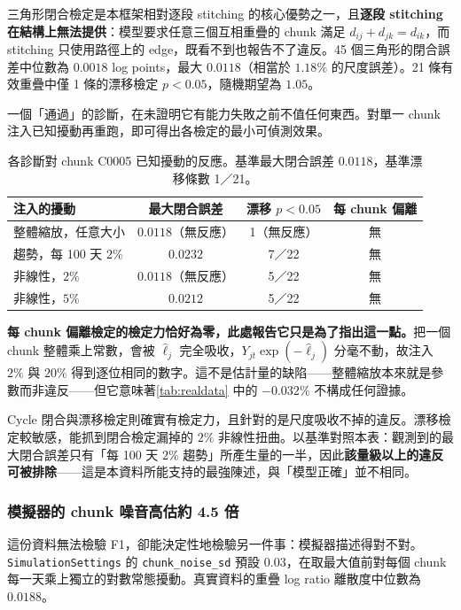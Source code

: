 \documentclass[12pt,a4paper,oneside]{article}
\begin{document}
三角形閉合檢定是本框架相對逐段 stitching 的核心優勢之一，且\textbf{逐段 stitching 在結構上無法提供}：模型要求任意三個互相重疊的 chunk 滿足 $d_{ij}+d_{jk}=d_{ik}$，而 stitching 只使用路徑上的 edge，既看不到也報告不了違反。45 個三角形的閉合誤差中位數為 $0.0018$ log points，最大 $0.0118$（相當於 $1.18\%$ 的尺度誤差）。21 條有效重疊中僅 1 條的漂移檢定 $p<0.05$，隨機期望為 $1.05$。

\begin{remark}
\label{rem:power}
一個「通過」的診斷，在未證明它有能力失敗之前不值任何東西。對單一 chunk 注入已知擾動再重跑，即可得出各檢定的最小可偵測效果。

\begin{table}[H]
\centering
\small
\caption{各診斷對 chunk C0005 已知擾動的反應。基準最大閉合誤差 $0.0118$，基準漂移條數 1／21。}
\label{tab:power}
\begin{tabular}{lccc}
\toprule
注入的擾動 & 最大閉合誤差 & 漂移 $p<0.05$ & 每 chunk 偏離\\
\midrule
整體縮放，任意大小 & $0.0118$（無反應） & 1（無反應） & 無\\
趨勢，每 100 天 $2\%$ & $0.0232$ & 7／22 & 無\\
非線性，$2\%$ & $0.0118$（無反應） & 5／22 & 無\\
非線性，$5\%$ & $0.0212$ & 5／22 & 無\\
\bottomrule
\end{tabular}
\end{table}

\textbf{每 chunk 偏離檢定的檢定力恰好為零，此處報告它只是為了指出這一點。}把一個 chunk 整體乘上常數，會被 $\hat\ell_j$ 完全吸收，$Y_{jt}\exp(-\hat\ell_j)$ 分毫不動，故注入 $2\%$ 與 $20\%$ 得到逐位相同的數字。這不是估計量的缺陷——整體縮放本來就是參數而非違反——但它意味著\cref{tab:realdata} 中的 $-0.032\%$ 不構成任何證據。

Cycle 閉合與漂移檢定則確實有檢定力，且針對的是尺度吸收不掉的違反。漂移檢定較敏感，能抓到閉合檢定漏掉的 $2\%$ 非線性扭曲。以基準對照本表：觀測到的最大閉合誤差只有「每 100 天 $2\%$ 趨勢」所產生量的一半，因此\textbf{該量級以上的違反可被排除}——這是本資料所能支持的最強陳述，與「模型正確」並不相同。
\end{remark}

\subsubsection{模擬器的 chunk 噪音高估約 4.5 倍}

這份資料無法檢驗 F1，卻能決定性地檢驗另一件事：模擬器描述得對不對。\texttt{SimulationSettings} 的 \texttt{chunk\_\allowbreak noise\_\allowbreak sd} 預設 $0.03$，在取最大值前對每個 chunk 每一天乘上獨立的對數常態擾動。真實資料的重疊 log ratio 離散度中位數為 $0.0188$。
\end{document}
